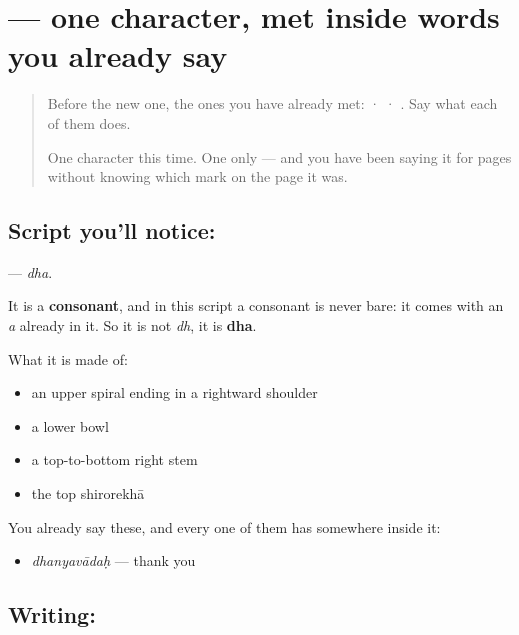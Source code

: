 \section[\texorpdfstring{\sk{ध} (dha)}{ध (dha)}]{ — one character, met inside words you already say}

\label{lesson:SA-S212-letter-dha}



\begin{quote}
Before the new one, the ones you have already met:  ·  · . Say what each of them does.

One character this time. One only — and you have been saying it for pages without knowing which mark on the page it was.
\end{quote}

\subsection*{Script you'll notice: }
\textbf{} — \emph{dha}.

It is a \textbf{consonant}, and in this script a consonant is never bare: it comes with an \emph{a} already in it. So it is not \emph{dh}, it is \textbf{dha}.

What it is made of:

\begin{itemize}
\raggedright
  \item an upper spiral ending in a rightward shoulder
  \item a lower bowl
  \item a top-to-bottom right stem
  \item the top shirorekhā
\end{itemize}

You already say these, and every one of them has  somewhere inside it:

\begin{itemize}
\raggedright
  \item \textbf{} \emph{dhanyavādaḥ} — thank you
\end{itemize}

\subsection*{Writing: }


